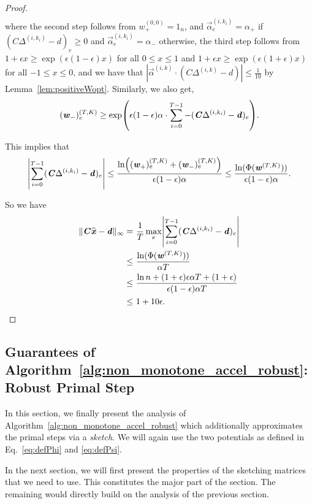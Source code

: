 \documentclass[11pt]{article}
\let\originalleft\left
\let\originalright\right
\renewcommand{\left}{\mathopen{}\mathclose\bgroup\originalleft}
\renewcommand{\right}{\aftergroup\egroup\originalright}
\newcommand\dd{\boldsymbol{\mathit{d}}}
\newcommand\ww{\boldsymbol{\mathit{w}}}
\newcommand\xx{\boldsymbol{\mathit{x}}}
\newcommand\CC{\boldsymbol{\mathit{C}}}
\newcommand\xxhat{\widehat{\xx}}
\begin{document}
\begin{proof}
\begin{align*}
\end{align*}
where the second step follows from $\ww_+^{(0,0)} = 1_{n}$, and $\overrightarrow{\alpha}_e^{(i,k_i)} = \alpha_+$ if $(\CC \Delta^{(i,k_i)} - \dd)_e \geq 0$ and $\overrightarrow{\alpha}_e^{(i,k_i)} = \alpha_-$ otherwise, the third step follows from $1 + \epsilon x \geq \exp(\epsilon (1-\epsilon) x)$ for all $0 \leq x \leq 1$ and $1 + \epsilon x \geq \exp(\epsilon (1 + \epsilon) x)$ for all $-1 \leq x \leq 0$, and we have that $|\overrightarrow{\alpha}^{(i,k)} \cdot (\CC \Delta^{(i,k)} - \dd)| \leq  \frac{1}{10}$ by Lemma~\ref{lem:positiveWopt}. Similarly, we also get,
\[
(\ww_{-})^{(T,K)}_e \geq \exp\left(\epsilon(1-\epsilon)\alpha \cdot \sum_{i=0}^{T-1} - (\CC \Delta^{(i,k_i)} - \dd)_e\right).
\]

This implies that
\begin{align}\label{eq:finalBound}
\left|\sum_{i=0}^{T-1} (\CC \Delta^{(i,k_i)} - \dd)_e\right| \leq \frac{\ln\left((\ww_+)^{(T,K)}_e +(\ww_{-})_e^{(T,K)}\right)}{\epsilon(1-\epsilon)\alpha} \leq \frac{\ln(\Phi(\ww^{(T,K)}))}{\epsilon(1-\epsilon)\alpha}.
\end{align}

So we have
\begin{align*}
\|\CC \xxhat - \dd\|_{\infty} = &~ \frac{1}{T} \max_e \left|\sum_{i=0}^{T-1} (\CC \Delta^{(i,k_i)} - \dd)_e\right| \\
\leq &~ \frac{\ln(\Phi(\ww^{(T,K)}))}{\alpha T} \\
\leq &~ \frac{\ln n + (1+\epsilon)\epsilon \alpha T + (1+\epsilon)}{\epsilon(1-\epsilon)\alpha T} \\
\leq &~ 1 + 10\epsilon. \qedhere
\end{align*}
\end{proof}


 
\subsection{Guarantees of Algorithm~\ref{alg:non_monotone_accel_robust}: Robust Primal Step}\label{sec:NonMonRob}

In this section, we finally present the analysis of Algorithm~\ref{alg:non_monotone_accel_robust} which additionally approximates the primal steps via a {\it sketch}. We will again use the two potentials as defined in Eq.~\eqref{eq:defPhi} and \eqref{eq:defPsi}.




In the next section, we will first present the properties of the sketching matrices that we need to use. This constitutes the major part of the section. The remaining would directly build on the analysis of the previous section.
\end{document}
